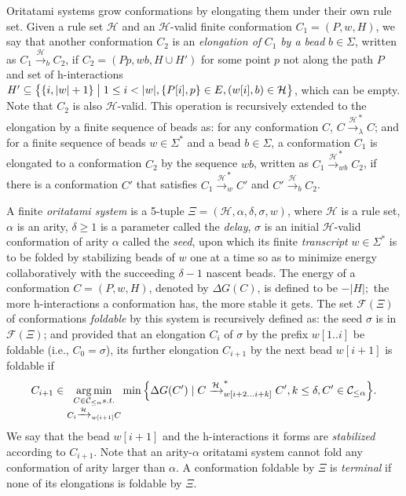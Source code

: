 Oritatami systems grow conformations by elongating them under their own rule set. 
Given a rule set $\mathcal{H}$ and an $\mathcal{H}$-valid finite conformation $C_1 = (P, w, H)$, 
we say that another conformation $C_2$ is an \textit{elongation of} $C_1$ \textit{by a bead} $b \in \Sigma$, written as $C_1 \xrightarrow{\mathcal{H}}_b C_2$, if $C_2 = (Pp, wb, H \cup H')$ for some point $p$ not along the path $P$ and set of h-interactions $H' \subseteq \left\{ \{i, |w|+1\} \bigm| 1\leq i < |w|, \{P[i], p\} \in E, (w[i], b) \in \mathcal{H}\right\}$, which can be empty.
Note that $C_2$ is also $\mathcal{H}$-valid.
This operation is recursively extended to the elongation by a finite sequence of beads as: 
for any conformation $C$, $C \xrightarrow{\mathcal{H}}^*_\lambda C$; 
and for a finite sequence of beads $w \in \Sigma^*$ and a bead $b \in \Sigma$,
a conformation $C_1$ is elongated to a conformation $C_2$ by the sequence $wb$,
written as $C_1 \xrightarrow{\mathcal{H}}^*_{wb} C_2$, if there is a conformation $C'$ that satisfies
$C_1 \xrightarrow{\mathcal{H}}^*_w C'$ and $C' \xrightarrow{\mathcal{H}}_b C_2$.

A finite \textit{oritatami system} is a 5-tuple $\Xi = (\mathcal{H}, \alpha, \delta, \sigma,w)$, where 
$\mathcal{H}$ is a rule set,
$\alpha$ is an arity, 
$\delta \geq 1$ is a parameter called the \textit{delay}, 
$\sigma$ is an initial $\mathcal{H}$-valid conformation of arity $\alpha$ called the \textit{seed}, upon which its finite \textit{transcript} $w \in \Sigma^*$ is to be folded by stabilizing beads of $w$ one at a time so as to minimize energy collaboratively with the succeeding $\delta -1$ nascent beads. 
The energy of a conformation $C = (P, w, H)$, denoted by $\Delta G(C)$, is defined to be $-|H|;$ the more h-interactions a conformation has, the more stable it gets.
The set $\mathcal{F}(\Xi)$ of conformations \textit{foldable} by this system is recursively defined as: 
the seed $\sigma$ is in $\mathcal{F}(\Xi)$; and provided that an elongation $C_{i}$ of $\sigma$ by the prefix $w[1..i]$ be foldable (i.e., $C_0 = \sigma$), its further elongation $C_{i+1}$ by the next bead $w[i+1]$ is foldable if
\begin{equation}\label{eq:cotranscriptional_folding}
C_{i+1} \in \operatorname*{arg\,min}_{
\substack{
C \in \mathcal{C}_{\le \alpha} s.t. \\
C_i \xrightarrow{\mathcal{H}}_{w[i+1]}C \\
}
}
\min \Big\{ \Delta G(C') \mid 
C \xrightarrow{\mathcal{H}}^*_{w[i+2...i+k]}C', k\le \delta, C' \in \mathcal{C}_{\le \alpha}
\Big\}.
\end{equation}
We say that the bead $w[i+1]$ and the h-interactions it forms are \textit{stabilized} according to $C_{i+1}$.
Note that an arity-$\alpha$ oritatami system cannot fold any conformation of arity larger than $\alpha$.
A conformation foldable by $\Xi$ is \textit{terminal} if none of its elongations is foldable by $\Xi$.

